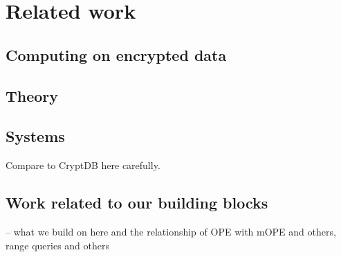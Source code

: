 
\section{Related work}\label{sec:related}

\subsection{Computing on encrypted data}

\subsection{Theory}


\subsection{Systems}

Compare to CryptDB here carefully. 

\subsection{Work related to our building blocks}

-- what we build on here and the relationship of OPE with mOPE and others, range queries and others

